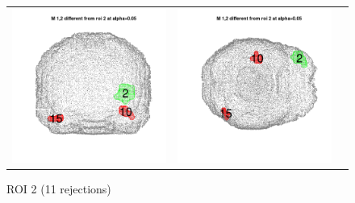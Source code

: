 \documentclass[12pt]{article}
\begin{document}
\begin{figure}[h]
\begin{tabular}{ccc}
\includegraphics[scale = 0.24]{../a7plots/d_2r_2_view2.png} & 
\includegraphics[scale = 0.24]{../a7plots/d_2r_2_view3.png} \\ 
\end{tabular}
\caption{ROI 2 (11 rejections)}
\end{figure}
\end{document}
